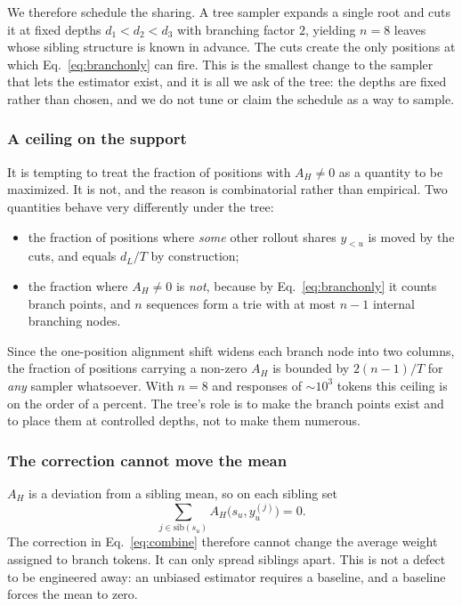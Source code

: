 \documentclass[11pt]{article}
\newcommand{\AH}{A_{H}}
\begin{document}
We therefore schedule the sharing. A tree sampler expands a single root and cuts it
at fixed depths $d_1 < d_2 < d_3$ with branching factor $2$, yielding $n = 8$ leaves
whose sibling structure is known in advance. The cuts create the only positions at
which Eq.~\eqref{eq:branchonly} can fire. This is the smallest change to the sampler
that lets the estimator exist, and it is all we ask of the tree: the depths are
fixed rather than chosen, and we do not tune or claim the schedule as a way to
sample.

\subsubsection{A ceiling on the support}

It is tempting to treat the fraction of positions with $\AH \neq 0$ as a quantity to
be maximized. It is not, and the reason is combinatorial rather than empirical. Two
quantities behave very differently under the tree:

\begin{itemize}
\item the fraction of positions where \emph{some} other rollout shares $y_{<u}$ is
      moved by the cuts, and equals $d_L/T$ by construction;
\item the fraction where $\AH \neq 0$ is \emph{not}, because by
      Eq.~\eqref{eq:branchonly} it counts branch points, and $n$ sequences form a
      trie with at most $n-1$ internal branching nodes.
\end{itemize}

Since the one-position alignment shift widens each branch node into two columns, the
fraction of positions carrying a non-zero $\AH$ is bounded by $2(n-1)/T$ for
\emph{any} sampler whatsoever. With $n = 8$ and responses of $\sim 10^3$ tokens this
ceiling is on the order of a percent. The tree's role is to make the branch points
exist and to place them at controlled depths, not to make them numerous.

\subsubsection{The correction cannot move the mean}
\label{sec:zerosum-app}

$\AH$ is a deviation from a sibling mean, so on each sibling set
%
\begin{equation}
\sum_{j \in \mathrm{sib}(s_u)} \AH\bigl(s_u, y^{(j)}_u\bigr) = 0 .
\label{eq:zerosum}
\end{equation}
%
The correction in Eq.~\eqref{eq:combine} therefore cannot change the average weight
assigned to branch tokens. It can only spread siblings apart. This is not a defect
to be engineered away: an unbiased estimator requires a baseline, and a baseline
forces the mean to zero.
\end{document}
